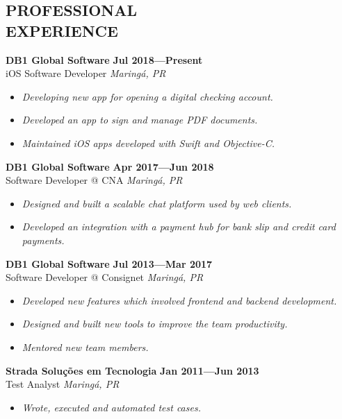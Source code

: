 \documentclass[line,margin]{res}
\begin{document}


\address{\sl marcosatanaka.com --- marcosatanaka@gmail.com --- (44) xxxxx - xxxx}


\begin{resume}


\section{PROFESSIONAL \\ EXPERIENCE}
  {\bf DB1 Global Software} \hfill {\bf Jul 2018---Present} \\
  iOS Software Developer \hfill {\sl Maring\'a, PR}\\[-6pt]
  \begin{itemize}
    \item {\sl Developing new app for opening a digital checking account.}
    \item {\sl Developed an app to sign and manage PDF documents.}
    \item {\sl Maintained iOS apps developed with Swift and Objective-C.}
  \end{itemize}

  {\bf DB1 Global Software} \hfill {\bf Apr 2017---Jun 2018} \\
  Software Developer @ CNA \hfill {\sl Maring\'a, PR}\\[-6pt]
  \begin{itemize}
    \item {\sl Designed and built a scalable chat platform used by web clients.}
    \item {\sl Developed an integration with a payment hub for
               bank slip and credit card payments.}
  \end{itemize}

  {\bf DB1 Global Software} \hfill {\bf Jul 2013---Mar 2017} \\
  Software Developer @ Consignet \hfill {\sl Maring\'a, PR}\\[-6pt]
  \begin{itemize}
    \item {\sl Developed new features which involved
               frontend and backend development.}
    \item {\sl Designed and built new tools to improve the team productivity.}
    \item {\sl Mentored new team members.}
  \end{itemize}

  {\bf Strada Solu\c{c}\~oes em Tecnologia} \hfill {\bf Jan 2011---Jun 2013} \\
  Test Analyst \hfill {\sl Maring\'a, PR}\\[-6pt]
    \begin{itemize}
    \item {\sl Wrote, executed and automated test cases.}
  \end{itemize}



\end{resume}
\end{document}
